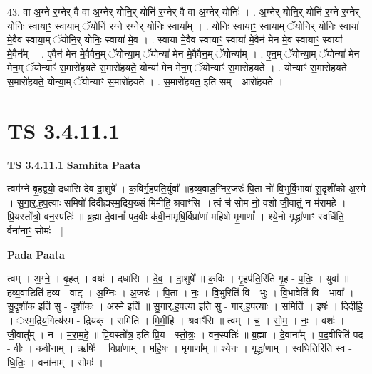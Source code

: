 \documentclass[17pt]{extarticle}
\begin{document}
43. वा अ॒ग्ने र॒ग्नेर् वै वा अ॒ग्नेर् योनि॒र् योनि॑ र॒ग्नेर् वै वा अ॒ग्नेर् योनिः॑ । . अ॒ग्नेर् योनि॒र् योनि॑ र॒ग्ने र॒ग्नेर् योनिः॒ स्वायाꣳ॒॒ स्वाया॒म् ॅयोनि॑ र॒ग्ने र॒ग्नेर् योनिः॒ स्वाया᳚म् । . योनिः॒ स्वायाꣳ॒॒ स्वाया॒म् ॅयोनि॒र् योनिः॒ स्वाया॑ मे॒वैव स्वाया॒म् ॅयोनि॒र् योनिः॒ स्वाया॑ मे॒व । . स्वाया॑ मे॒वैव स्वायाꣳ॒॒ स्वाया॑ मे॒वैन॑ मेन मे॒व स्वायाꣳ॒॒ स्वाया॑ मे॒वैन᳚म् । . ए॒वैन॑ मेन मे॒वैवैन॒म् ॅयोन्या॒म् ॅयोन्या॑ मेन मे॒वैवैन॒म् ॅयोन्या᳚म् । . ए॒न॒म् ॅयोन्या॒म् ॅयोन्या॑ मेन मेन॒म् ॅयोन्याꣳ॑ स॒मारो॑हयते स॒मारो॑हयते॒ योन्या॑ मेन मेन॒म् 
ॅयोन्याꣳ॑ स॒मारो॑हयते । . योन्याꣳ॑ स॒मारो॑हयते स॒मारो॑हयते॒ योन्या॒म् ॅयोन्याꣳ॑ स॒मारो॑हयते । . स॒मारो॑हयत॒ इति॑ सम् - आरो॑हयते । \newline
\pagebreak
{}

\section{ TS 3.4.11.1 }

\textbf{TS 3.4.11.1 } \newline
\textbf{Samhita Paata} \newline

त्वम॑ग्ने बृ॒हद्वयो॒ दधा॑सि देव दा॒शुषे᳚ । क॒विर्गृ॒हप॑ति॒र्युवा᳚ ॥ह॒व्य॒वाड॒ग्निर॒जरः॑ पि॒ता नो॑ वि॒भुर्वि॒भावा॑ सु॒दृशी॑को अ॒स्मे । सु॒गा॒र्॒.ह॒प॒त्याः समिषो॑ दिदीह्यस्म॒द्रिय॒ख्सं मि॑मीहि॒ श्रवाꣳ॑सि ॥ त्वं च॑ सोम नो॒ वशो॑ जी॒वातुं॒ न म॑रामहे । प्रि॒यस्तो᳚त्रो॒ वन॒स्पतिः॑ ॥ ब्र॒ह्मा दे॒वानां᳚ पद॒वीः क॑वी॒नामृषि॒र्विप्रा॑णां महि॒षो मृ॒गाणां᳚ । श्ये॒नो गृद्ध्रा॑णाꣳ॒॒ स्वधि॑ति॒ र्वना॑नाꣳ॒॒ सोमः॑ - [  ] \newline

\textbf{Pada Paata} \newline

त्वम् । अ॒ग्ने॒ । बृ॒हत् । वयः॑ । दधा॑सि । दे॒व॒ । दा॒शुषे᳚ ॥ क॒विः । गृ॒हप॑ति॒रिति॑ गृ॒ह - प॒तिः॒ । युवा᳚ ॥ ह॒व्य॒वाडिति॑ हव्य - वाट् । अ॒ग्निः । अ॒जरः॑ । पि॒ता । नः॒ । वि॒भुरिति॑ वि - भुः । वि॒भावेति॑ वि - भावा᳚ । सु॒दृशी॑क॒ इति॑ सु - दृशी॑कः । अ॒स्मे इति॑ ॥ सु॒गा॒र्॒.ह॒प॒त्या इति॑ सु - गा॒र्॒.ह॒प॒त्याः । समिति॑ । इषः॑ । दि॒दी॒हि॒ । ॒स्म॒द्रिय॒गित्य॑स्म - द्रिय॑क् । समिति॑ । मि॒मी॒हि॒ । श्रवाꣳ॑सि ॥ त्वम् । च॒ । सो॒म॒ । नः॒ । वशः॑ । जी॒वातु᳚म् । न । म॒रा॒म॒हे॒ ॥ प्रि॒यस्तो᳚त्र॒ इति॑ प्रि॒य - स्तो॒त्रः॒ । वन॒स्पतिः॑ ॥ ब्र॒ह्मा । दे॒वाना᳚म् । प॒द॒वीरिति॑ पद - वीः । क॒वी॒नाम् । ऋषिः॑ । विप्रा॑णाम् । म॒हि॒षः । मृ॒गाणा᳚म् ॥ श्ये॒नः । गृद्ध्रा॑णाम् । स्वधि॑ति॒रिति॒ स्व - धि॒तिः॒ । वना॑नाम् । सोमः॑ ।  \newline
\end{document}
